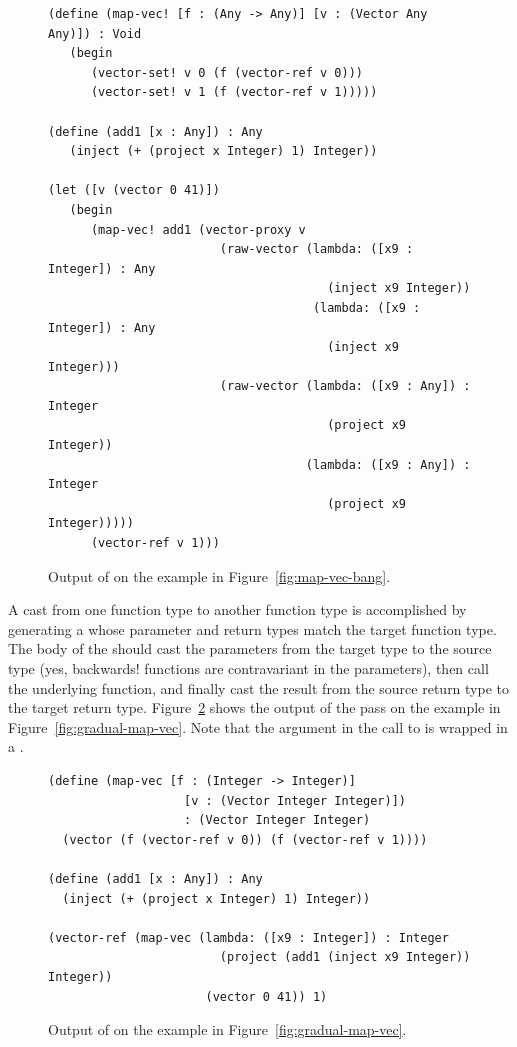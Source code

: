 \documentclass[11pt]{book}
\begin{document}
\begin{figure}[tbp]
\begin{lstlisting}
(define (map-vec! [f : (Any -> Any)] [v : (Vector Any Any)]) : Void
   (begin 
      (vector-set! v 0 (f (vector-ref v 0)))
      (vector-set! v 1 (f (vector-ref v 1)))))
  
(define (add1 [x : Any]) : Any
   (inject (+ (project x Integer) 1) Integer))

(let ([v (vector 0 41)])
   (begin 
      (map-vec! add1 (vector-proxy v
                        (raw-vector (lambda: ([x9 : Integer]) : Any
                                       (inject x9 Integer))
                                     (lambda: ([x9 : Integer]) : Any
                                       (inject x9 Integer)))
                        (raw-vector (lambda: ([x9 : Any]) : Integer
                                       (project x9 Integer))
                                    (lambda: ([x9 : Any]) : Integer
                                       (project x9 Integer)))))
      (vector-ref v 1)))
\end{lstlisting}
\caption{Output of  on the example in
  Figure~\ref{fig:map-vec-bang}.}
\label{fig:map-vec-bang-lower-cast}
\end{figure}

A cast from one function type to another function type is accomplished
by generating a  whose parameter and return types match
the target function type. The body of the  should cast
the parameters from the target type to the source type (yes,
backwards! functions are contravariant in the
parameters), then call the underlying function, and finally cast the
result from the source return type to the target return type.
Figure~\ref{fig:map-vec-lower-cast} shows the output of the
 pass on the  example in
Figure~\ref{fig:gradual-map-vec}. Note that the  argument
in the call to  is wrapped in a .

\begin{figure}[tbp]
\begin{lstlisting}
(define (map-vec [f : (Integer -> Integer)]
                   [v : (Vector Integer Integer)])
                   : (Vector Integer Integer)
  (vector (f (vector-ref v 0)) (f (vector-ref v 1))))

(define (add1 [x : Any]) : Any
  (inject (+ (project x Integer) 1) Integer))

(vector-ref (map-vec (lambda: ([x9 : Integer]) : Integer
                        (project (add1 (inject x9 Integer)) Integer))
                      (vector 0 41)) 1)
\end{lstlisting}
\caption{Output of  on the example in
  Figure~\ref{fig:gradual-map-vec}.}
\label{fig:map-vec-lower-cast}
\end{figure}
\end{document}
